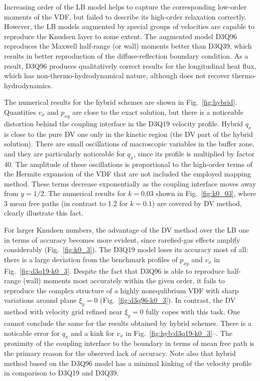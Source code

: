 \documentclass{elsarticle} %
\begin{document}
Increasing order of the LB model helps to capture the corresponding low-order moments of the VDF,
but failed to describe its high-order relaxation correctly.
However, the LB models augmented by special groups of velocities are capable to reproduce the Knudsen layer to some extent.
The augmented model D3Q96 reproduces the Maxwell half-range (or wall) moments better than D3Q39,
which results in better reproduction of the diffuse-reflection boundary condition.
As a result, D3Q96 produces qualitatively correct results for the longitudinal heat flux,
which has non-thermo-hydrodynamical nature, although does not recover thermo-hydrodynamics.

The numerical results for the hybrid schemes are shown in Fig.~\ref{fig:hybrid}.
Quantities \(v_x\) and \(p_{xy}\) are close to the exact solution,
but there is a noticeable distortion behind the coupling interface in the D3Q19 velocity profile.
Hybrid \(q_x\) is close to the pure DV one only in the kinetic region (the DV part of the hybrid solution).
There are small oscillations of macroscopic variables in the buffer zone,
and they are particularly noticeable for \(q_x\), since its profile is multiplied by factor 40.
The amplitude of these oscillations is proportional to the high-order terms of the Hermite expansion of the VDF
that are not included the employed mapping method.
These terms decrease exponentially as the coupling interface moves away from \(y=1/2\).
The numerical results for \(k=0.03\) shown in Fig.~\ref{fig:k0_03},
where 3 mean free paths (in contrast to 1.2 for \(k=0.1\)) are covered by DV method, clearly illustrate this fact.

For larger Knudsen numbers, the advantage of the DV method over the LB one in terms of accuracy becomes more evident,
since rarefied-gas effects amplify considerably (Fig.~\ref{fig:k0_3}).
The D3Q19 model loses its accuracy most of all:
there is a large deviation from the benchmark profiles of \(p_{xy}\) and \(v_x\) in Fig.~\ref{fig:d3q19-k0_3}.
Despite the fact that D3Q96 is able to reproduce half-range (wall) moments most accurately within the given order,
it fails to reproduce the complex structure of a highly nonequlibrium VDF with sharp variations
around plane \(\xi_y=0\) (Fig.~\ref{fig:d3q96-k0_3}).
In contrast, the DV method with velocity grid refined near \(\xi_y=0\) fully copes with this task.
One cannot conclude the same for the results obtained by hybrid schemes.
There is a noticable error for \(q_x\) and a kink for \(v_x\) in Fig.~\ref{fig:hyb:d3q19-k0_3}--.
The proximity of the coupling interface to the boundary in terms of mean free path is the primary reason
for the observed lack of accuracy. Note also that hybrid method based on the D3Q96 model has a minimal kinking
of the velocity profile in comparison to D3Q19 and D3Q39.
\end{document}
